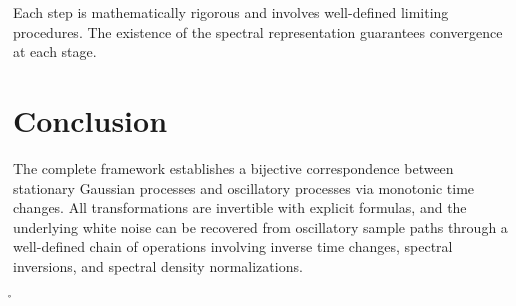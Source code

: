 \documentclass{article}
\begin{document}
Each step is mathematically rigorous and involves well-defined limiting
procedures. The existence of the spectral representation guarantees
convergence at each stage.

\section{Conclusion}

The complete framework establishes a bijective correspondence between
stationary Gaussian processes and oscillatory processes via monotonic time
changes. All transformations are invertible with explicit formulas, and the
underlying white noise can be recovered from oscillatory sample paths through
a well-defined chain of operations involving inverse time changes, spectral
inversions, and spectral density normalizations.

\r{}
\end{document}

